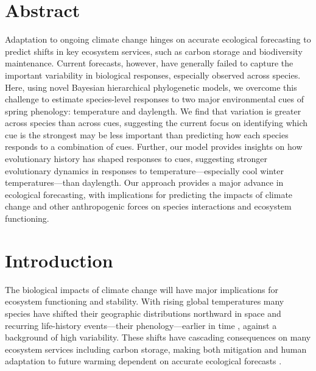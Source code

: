 \documentclass[11pt]{article}
\begin{document}
\clearpage




\section*{Abstract}
Adaptation to ongoing climate change hinges on accurate ecological forecasting to predict shifts in key ecosystem services, such as carbon storage and biodiversity maintenance. Current forecasts, however, have generally failed to capture the important variability in biological responses, especially observed across species.  Here, using novel Bayesian hierarchical phylogenetic models, we overcome this challenge to estimate species-level responses to two major environmental cues of spring phenology: temperature and daylength. We find that variation is greater across species than across cues, suggesting the current focus on identifying which cue is the strongest may be less important than predicting how each species responds to a combination of cues. Further, our model provides insights on how evolutionary history has shaped responses to cues, suggesting stronger evolutionary dynamics in responses to temperature---especially cool winter temperatures---than daylength. Our approach provides a major advance in ecological forecasting, with implications for predicting the impacts of climate change and other anthropogenic forces on species interactions and ecosystem functioning. 
\clearpage





\linenumbers
\section*{Introduction}
The biological impacts of climate change will have major implications for ecosystem functioning and stability. With rising global temperatures many species have shifted their geographic distributions northward in space and recurring life-history events---their phenology---earlier in time \citep{IPCC:2014sm,parmesan2003}, against a background of high variability. These shifts have cascading consequences on many ecosystem services including carbon storage, making both mitigation and human adaptation to future warming dependent on accurate ecological forecasts \citep{richardson2013}. 
\end{document}
